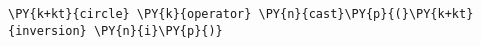 \begin{Verbatim}[commandchars=\\\{\}]
    \PY{k+kt}{circle} \PY{k}{operator} \PY{n}{cast}\PY{p}{(}\PY{k+kt}{inversion} \PY{n}{i}\PY{p}{)}
\end{Verbatim}
